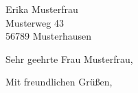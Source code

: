 \documentclass[%
  a4paper,
  foldmarks=true,
  foldmarks=H,
  formalign=left,
  fontsize=12pt, %
  version=last%
]{scrlttr2}
\begin{document}
\begin{letter}{%
  Erika Musterfrau\\
  Musterweg 43\\
  56789 Musterhausen%
}




\opening{Sehr geehrte Frau Musterfrau,}

\closing{Mit freundlichen Grüßen,}

%

\end{letter}
\end{document}
